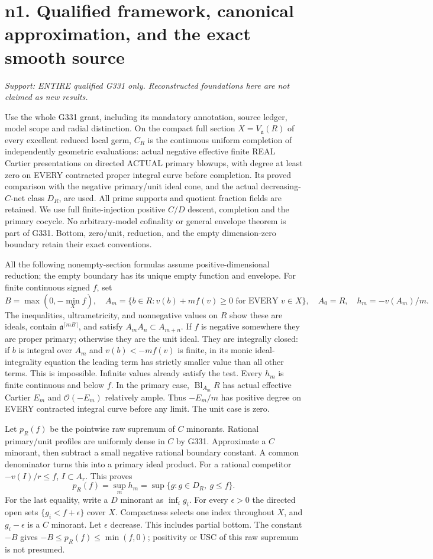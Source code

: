\section{n1. Qualified framework, canonical approximation, and the exact smooth source}
\textit{Support: ENTIRE qualified G331 only. Reconstructed foundations here are not claimed as new results.}

Use the whole G331 grant, including its mandatory annotation, source ledger,
model scope and radial distinction. On the compact full section
$X=V_{\mathfrak a}(R)$ of every excellent reduced local germ, $C_R$ is the
continuous uniform completion of independently geometric evaluations:
actual negative effective finite REAL Cartier presentations on directed
ACTUAL primary blowups, with degree at least zero on EVERY contracted
proper integral curve before completion. Its proved comparison with the
negative primary/unit ideal cone, and the actual decreasing-$C$-net class
$D_R$, are used. All prime supports and quotient fraction fields are retained.
We use full finite-injection positive $C/D$ descent, completion and the
primary cocycle. No arbitrary-model cofinality or general envelope theorem
is part of G331. Bottom, zero/unit, reduction, and the empty dimension-zero
boundary retain their exact conventions.

All the following nonempty-section formulas assume positive-dimensional reduction;
the empty boundary has its unique empty function and envelope.
For finite continuous signed $f$, set
\[
 B=\max(0,-\min_X f),\quad
 A_m=\{b\in R:v(b)+mf(v)\ge0\text{ for EVERY }v\in X\},\quad
 A_0=R,\quad h_m=-v(A_m)/m.
\]
The inequalities, ultrametricity, and nonnegative values on $R$ show these
are ideals, contain $\mathfrak a^{\lceil mB\rceil}$, and satisfy
$A_mA_n\subset A_{m+n}$. If $f$ is negative somewhere they are proper
primary; otherwise they are the unit ideal. They are integrally closed:
if $b$ is integral over $A_m$ and $v(b)<-mf(v)$ is finite, in its monic
ideal-integrality equation the leading term has strictly smaller value than
all other terms. This is impossible. Infinite values already satisfy the
test. Every $h_m$ is finite continuous and below $f$. In the primary case,
$\operatorname{Bl}_{A_m}R$ has actual effective Cartier $E_m$ and
$\mathcal O(-E_m)$ relatively ample. Thus $-E_m/m$ has positive degree on
EVERY contracted integral curve before any limit. The unit case is zero.

Let $p_R(f)$ be the pointwise raw supremum of $C$ minorants. Rational
primary/unit profiles are uniformly dense in $C$ by G331. Approximate a
$C$ minorant, then subtract a small negative rational boundary constant.
A common denominator turns this into a primary ideal product. For a
rational competitor $-v(I)/r\le f$, $I\subset A_r$. This proves
\[
 p_R(f)=\sup_m h_m=\sup\{g:g\in D_R,\ g\le f\}.
\]
For the last equality, write a $D$ minorant as $\inf_i g_i$. For every
$\epsilon>0$ the directed open sets $\{g_i<f+\epsilon\}$ cover $X$.
Compactness selects one index throughout $X$, and $g_i-\epsilon$ is a
$C$ minorant. Let $\epsilon$ decrease. This includes partial bottom.
The constant $-B$ gives $-B\le p_R(f)\le\min(f,0)$; positivity or USC
of this raw supremum is not presumed.

